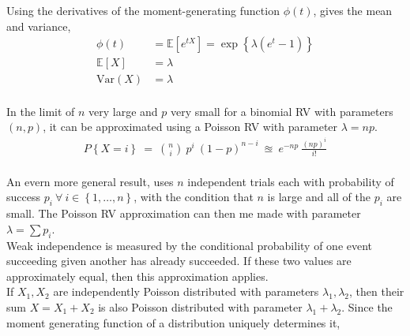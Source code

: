 \begin{figure}[!h]
	\centering
\end{figure}

Using the derivatives of the moment-generating function $ \phi(t) $, gives the mean and variance, \\

\begin{align}
	\phi(t) &= \mathbb{E}[e^{tX}] = \exp\left\{\lambda (e^t - 1)\right\}\\[1ex]
	\mathbb{E}[X] &= \lambda \\[1ex]
	\mathrm{Var}(X) &= \lambda
\end{align} \\

In the limit of $ n $ very large and $ p $ very small for a binomial RV with parameters $ (n, p) $, it can be approximated using a Poisson RV with parameter $ \lambda = np $.\\

\begin{align}
	P \left\{X = i\right\}\ =\ \binom{n}{i}\ p^i\ (1-p)^{n-i}\ \approxeq\ e^{-np}\ \frac{(np)^i}{i!}
\end{align} \\

An evern more general result, uses $ n $ independent trials each with probability of success $ p_i \ \forall\ i \in \left\{1, \dots, n\right\}$, with the condition that $ n $ is large and all of the $ p_i $ are small. The Poisson RV approximation can then me made with parameter $ \lambda = \sum p_i $. \\

Weak independence is measured by the conditional probability of one event succeeding given another has already succeeded. If these two values are approximately equal, then this approximation applies.\\

If $ X_1, X_2 $ are independently Poisson distributed with parameters $ \lambda_1, \lambda_2 $, then their sum $ X = X_1 + X_2 $ is also Poisson distributed with parameter $ \lambda_1 + \lambda_2 $. Since the moment generating function of a distribution uniquely determines it, \\

